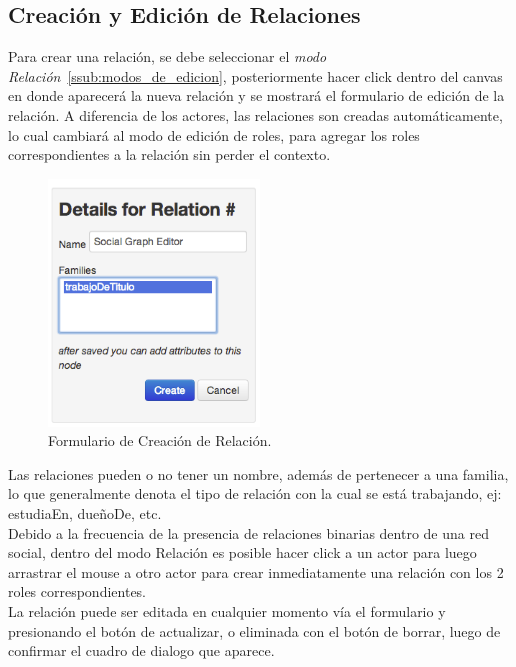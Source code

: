 \subsection{Creación y Edición de Relaciones} %
\label{sub:creacion_y_edicion_de_relaciones}

Para crear una relación, se debe seleccionar el \emph{modo Relación}~\ref{ssub:modos_de_edicion}, posteriormente hacer click dentro del canvas en donde aparecerá la nueva relación y se mostrará el formulario de edición de la relación. A diferencia de los actores, las relaciones son creadas automáticamente, lo cual cambiará al modo de edición de roles, para agregar los roles correspondientes a la relación sin perder el contexto.

\begin{figure}[H]
  \centering
  \includegraphics[width=0.5\textwidth]{images/creacion_relacion.png}
  \caption{Formulario de Creación de Relación.}
  \label{creacion_relacion}
\end{figure}

Las relaciones pueden o no tener un nombre, además de pertenecer a una familia, lo que generalmente denota el tipo de relación con la cual se está trabajando, ej: estudiaEn, dueñoDe, etc.\\

Debido a la frecuencia de la presencia de relaciones binarias dentro de una red social, dentro del modo Relación es posible hacer click a un actor para luego arrastrar el mouse a otro actor para crear inmediatamente una relación con los 2 roles correspondientes.\\

La relación puede ser editada en cualquier momento vía el formulario y presionando el botón de actualizar, o eliminada con el botón de borrar, luego de confirmar el cuadro de dialogo que aparece.


